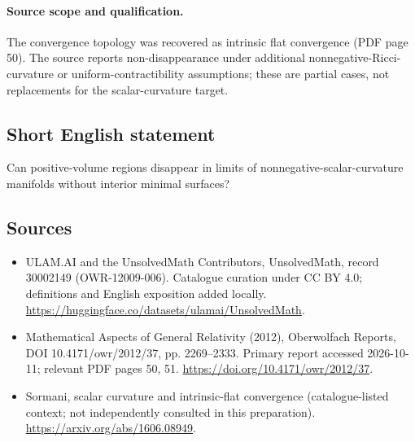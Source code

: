 \documentclass[11pt]{article}
\begin{document}
\paragraph{Source scope and qualification.}
The convergence topology was recovered as intrinsic flat convergence (PDF page 50). The source reports non-disappearance under additional nonnegative-Ricci-curvature or uniform-contractibility assumptions; these are partial cases, not replacements for the scalar-curvature target.
\subsection{Short English statement}
Can positive-volume regions disappear in limits of nonnegative-scalar-curvature manifolds without interior minimal surfaces?
\subsection{Sources}
\begin{itemize}
\item[\hypertarget{source:30002149:1}{S1}] ULAM.AI and the UnsolvedMath Contributors, UnsolvedMath, record 30002149 (OWR-12009-006). Catalogue curation under CC BY 4.0; definitions and English exposition added locally.
\url{https://huggingface.co/datasets/ulamai/UnsolvedMath}.
\item[\hypertarget{source:30002149:2}{S2}] Mathematical Aspects of General Relativity (2012), Oberwolfach Reports, DOI 10.4171/owr/2012/37, pp. 2269--2333. Primary report accessed 2026-10-11; relevant PDF pages 50, 51.
\url{https://doi.org/10.4171/owr/2012/37}.
\item[\hypertarget{source:30002149:3}{S3}] Sormani, scalar curvature and intrinsic-flat convergence (catalogue-listed context; not independently consulted in this preparation).
\url{https://arxiv.org/abs/1606.08949}.
\end{itemize}
\label{end:30002149}
\end{document}
